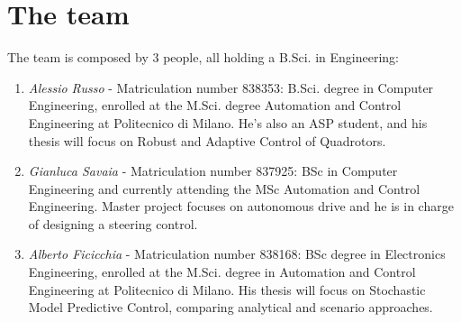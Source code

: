 \chapter*{The team}
The team is composed by 3 people, all holding a B.Sci. in Engineering: 
\begin{enumerate}
\item \emph{Alessio Russo} - Matriculation number 838353: B.Sci. degree in Computer Engineering, enrolled at the M.Sci. degree Automation and Control Engineering at Politecnico di Milano. He's also an ASP student, and his thesis will focus on Robust and Adaptive Control of Quadrotors.
\item \emph{Gianluca Savaia} - Matriculation number 837925: BSc in Computer Engineering and currently attending the MSc Automation and Control Engineering. Master project focuses on autonomous drive and he is in charge of designing a steering control.

\item \emph{Alberto Ficicchia} -  Matriculation number 838168: BSc degree in Electronics Engineering, enrolled at the M.Sci. degree in Automation and Control Engineering at Politecnico di Milano. His thesis will focus on Stochastic Model Predictive Control, comparing analytical and scenario approaches.
\end{enumerate}